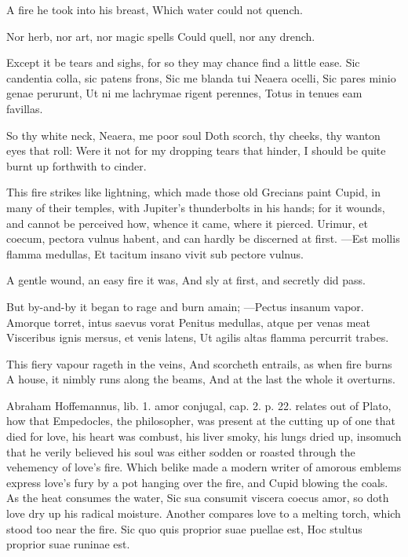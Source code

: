 A fire he took into his breast,
Which water could not quench.

Nor herb, nor art, nor magic spells
Could quell, nor any drench.

Except it be tears and sighs, for so they may chance find a little
ease.
Sic candentia colla, sic patens frons,
Sic me blanda tui Neaera ocelli,
Sic pares minio genae perurunt,
Ut ni me lachrymae rigent perennes,
Totus in tenues eam favillas.

So thy white neck, Neaera, me poor soul
Doth scorch, thy cheeks, thy wanton eyes that roll:
Were it not for my dropping tears that hinder,
I should be quite burnt up forthwith to cinder.

This fire strikes like lightning, which made those old Grecians paint
Cupid, in many of their temples, with Jupiter's thunderbolts in
his hands; for it wounds, and cannot be perceived how, whence it came,
where it pierced. Urimur, et coecum, pectora vulnus habent, and
can hardly be discerned at first.
---Est mollis flamma medullas,
Et tacitum insano vivit sub pectore vulnus.

A gentle wound, an easy fire it was,
And sly at first, and secretly did pass.

But by-and-by it began to rage and burn amain;
---Pectus insanum vapor.
Amorque torret, intus saevus vorat
Penitus medullas, atque per venas meat
Visceribus ignis mersus, et venis latens,
Ut agilis altas flamma percurrit trabes.

This fiery vapour rageth in the veins,
And scorcheth entrails, as when fire burns
A house, it nimbly runs along the beams,
And at the last the whole it overturns.

Abraham Hoffemannus, lib. 1. amor conjugal, cap. 2. p. 22. relates out
of Plato, how that Empedocles, the philosopher, was present at the
cutting up of one that died for love, his heart was combust, his
liver smoky, his lungs dried up, insomuch that he verily believed his
soul was either sodden or roasted through the vehemency of love's fire.
Which belike made a modern writer of amorous emblems express love's
fury by a pot hanging over the fire, and Cupid blowing the coals. As
the heat consumes the water, Sic sua consumit viscera coecus
amor, so doth love dry up his radical moisture. Another compares love
to a melting torch, which stood too near the fire.
Sic quo quis proprior suae puellae est,
Hoc stultus proprior suae runinae est.

